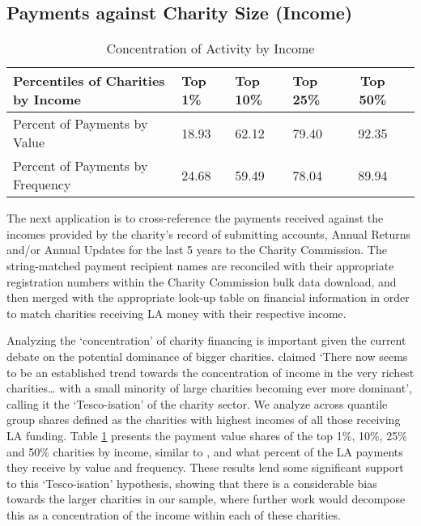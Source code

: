\documentclass[12pt]{article}
\begin{document}
\subsection{Payments against Charity Size (Income)}

\begin{table}[!b]
\centering
\caption{Concentration of Activity by Income}
\label{concentrationtable}
\begin{tabular}{llllcc}\toprule
Percentiles of Charities by Income & Top 1\% & Top 10\% &  Top 25\% &  Top 50\% \\ \midrule
Percent of Payments by Value & 18.93 & 62.12 & 79.40 & 92.35 \\
Percent of Payments by Frequency & 24.68 & 59.49 & 78.04 & 89.94\\ \bottomrule
\end{tabular}
\end{table}

The next application is to cross-reference the payments received against the incomes provided by the charity's record of submitting accounts, Annual Returns and/or Annual Updates for the last 5 years to the Charity Commission. The string-matched payment recipient names are reconciled with their appropriate registration numbers within the Charity Commission bulk data download, and then merged with the appropriate look-up table on financial information in order to match charities receiving LA money with their respective income.

Analyzing the ‘concentration’ of charity financing is important given the current debate on the potential dominance of bigger charities. \cite{ids2005} claimed ‘There now seems to be an established trend towards the concentration of income in the very richest charities… with a small minority of large charities becoming ever more dominant’, calling it the `Tesco-isation’ of the charity sector. We analyze across quantile group shares defined as the charities with highest incomes of all those receiving LA funding. Table \ref{concentrationtable} presents the payment value shares of the top 1\%, 10\%, 25\% and 50\% charities by income, similar to \cite{backusandclifford2013}, and what percent of the LA payments they receive by value and frequency. These results lend some significant support to this `Tesco-isation' hypothesis, showing that there is a considerable bias towards the larger charities in our sample, where further work would decompose this as a concentration of the income within each of these charities.
			
\end{document}
